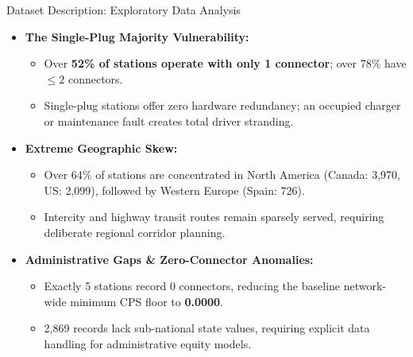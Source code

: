 \documentclass[aspectratio=169,10pt]{beamer}
\begin{document}
\begin{frame}{Dataset Description: Exploratory Data Analysis}
  \vspace{0.25cm}
  \begin{itemize}\setlength{\itemsep}{0.35cm}
    \item \textbf{The Single-Plug Majority Vulnerability:}
      \begin{itemize}\setlength{\itemsep}{0.12cm}
        \item Over \textbf{52\% of stations operate with only 1 connector}; over 78\% have $\le 2$ connectors.
        \item Single-plug stations offer zero hardware redundancy; an occupied charger or maintenance fault creates total driver stranding.
      \end{itemize}
    \item \textbf{Extreme Geographic Skew:}
      \begin{itemize}\setlength{\itemsep}{0.12cm}
        \item Over 64\% of stations are concentrated in North America (Canada: 3,970, US: 2,099), followed by Western Europe (Spain: 726).
        \item Intercity and highway transit routes remain sparsely served, requiring deliberate regional corridor planning.
      \end{itemize}
    \item \textbf{Administrative Gaps \& Zero-Connector Anomalies:}
      \begin{itemize}\setlength{\itemsep}{0.12cm}
        \item Exactly 5 stations record 0 connectors, reducing the baseline network-wide minimum CPS floor to \textbf{0.0000}.
        \item 2,869 records lack sub-national state values, requiring explicit data handling for administrative equity models.
      \end{itemize}
  \end{itemize}
\end{frame}
\end{document}
